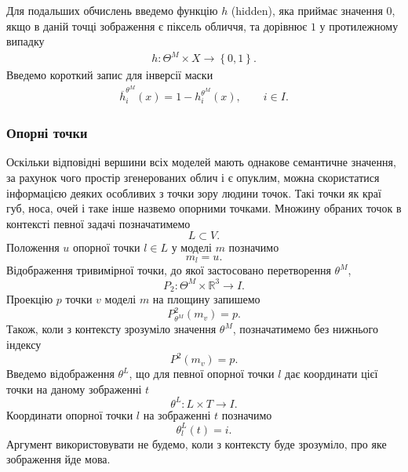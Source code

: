 Для подальших обчислень введемо функцію $h$ (hidden),
яка приймає значення $0$,
якщо в даній точці зображення є піксель обличчя,
та дорівнює $1$ у протилежному випадку
\begin{align*}
  h: \Theta^M \times X \rightarrow \left\{ 0, 1 \right\}.
\end{align*}
Введемо короткий запис для інверсії маски
\begin{align*}
  \overline{h}^{\theta^M}_i\left( x \right)
  = 1 - h^{\theta^M}_i\left( x \right),\qquad
  i \in I.
\end{align*}

\subsubsection{Опорні точки}

Оскільки відповідні вершини всіх моделей мають однакове семантичне значення,
за рахунок чого простір згенерованих облич і є опуклим,
можна скористатися інформацією деяких особливих з точки зору людини точок.
Такі точки як краї губ, носа, очей і таке інше назвемо опорними точками.
Множину обраних точок в контексті певної задачі позначатимемо
\begin{equation*}
  L \subset V.
\end{equation*}
Положення $u$ опорної точки $l \in L$ у моделі $m$ позначимо
\begin{equation*}
  m_{l} = u.
\end{equation*}
Відображення тривимірної точки,
до якої застосовано перетворення $\theta^M$,
\begin{equation*}
  P_2: \Theta^M \times \mathbb{R}^3 \rightarrow I.
\end{equation*}
Проекцію $p$ точки $v$ моделі $m$ на площину запишемо
\begin{equation*}
  P^2_{\theta^M}\left( m_v \right) = p.
\end{equation*}
Також, коли з контексту зрозуміло значення $\theta^M$,
позначатимемо без нижнього індексу
\begin{equation*}
  P^2\left( m_v \right) = p.
\end{equation*}
Введемо відображення $\theta^L$,
що для певної опорної точки $l$
дає координати цієї точки на даному зображенні $t$
\begin{equation*}
  \theta^L: L \times T \rightarrow I.
\end{equation*}
Координати опорної точки $l$ на зображенні $t$ позначимо
\begin{equation*}
  \theta_l^L\left( t \right) = i.
\end{equation*}
Аргумент використовувати не будемо, коли з контексту буде зрозуміло,
про яке зображення йде мова.

